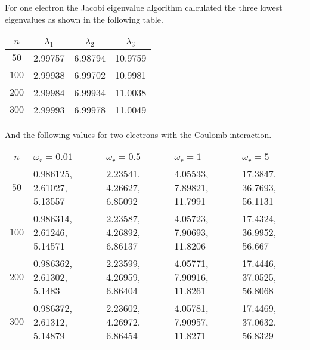 For one electron the Jacobi eigenvalue algorithm calculated the
three lowest eigenvalues as shown in the following table.
\begin{center}
    \begin{tabular}{|c|c|c|c|}
        \hline
        $n$ & $\lambda_1$ & $\lambda_2$ & $\lambda_3$ \\
        \hline
        \hline
        $50$ & 2.99757 & 6.98794 & 10.9759 \\
        \hline
        $100$ & 2.99938 & 6.99702 & 10.9981 \\
        \hline
        $200$ & 2.99984 & 6.99934 & 11.0038 \\
        \hline
        $300$ & 2.99993 & 6.99978 & 11.0049 \\
        \hline
    \end{tabular}
\end{center}
And the following values for two electrons with the Coulomb
interaction.
\begin{center}
    \begin{tabular}{|c|p{1.5cm}|p{1.5cm}|p{1.5cm}|p{1.5cm}|}
        \hline
        $n$ & $\omega_r = 0.01$ & $\omega_r = 0.5$ & $\omega_r = 1$
        & $\omega_r = 5$ \\
        \hline
        \hline
        $50$ & 0.986125, 2.61027, 5.13557 & 2.23541, 4.26627, 6.85092 &
        4.05533, 7.89821, 11.7991 & 17.3847, 36.7693, 56.1131 \\
        \hline
        $100$ & 0.986314, 2.61246, 5.14571 & 2.23587, 4.26892, 6.86137
        & 4.05723, 7.90693, 11.8206 & 17.4324, 36.9952, 56.667 \\
        \hline
        $200$ & 0.986362, 2.61302, 5.1483 & 2.23599, 4.26959, 6.86404 &
        4.05771, 7.90916, 11.8261 & 17.4446, 37.0525, 56.8068 \\
        \hline
        $300$ & 0.986372, 2.61312, 5.14879 & 2.23602, 4.26972, 6.86454
        & 4.05781, 7.90957, 11.8271 & 17.4469, 37.0632, 56.8329 \\
        \hline
    \end{tabular}
\end{center}

